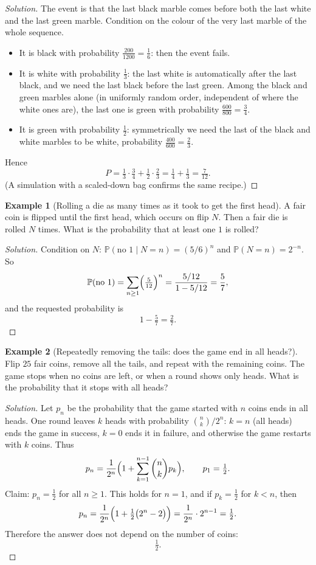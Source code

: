 \documentclass[11pt]{article}
\theoremstyle{definition}
\newtheorem{example}{Example}[section]
\begin{document}
\begin{proof}[Solution]
The event is that the last black marble comes before both the last white and the last green marble. Condition on the colour of the very last marble of the whole sequence.
\begin{itemize}
    \item It is black with probability $\tfrac{200}{1200}=\tfrac16$: then the event fails.
    \item It is white with probability $\tfrac13$: the last white is automatically after the last black, and we need the last black before the last green. Among the black and green marbles alone (in uniformly random order, independent of where the white ones are), the last one is green with probability $\tfrac{600}{800}=\tfrac34$.
    \item It is green with probability $\tfrac12$: symmetrically we need the last of the black and white marbles to be white, probability $\tfrac{400}{600}=\tfrac23$.
\end{itemize}
Hence
\[
P=\tfrac13\cdot\tfrac34+\tfrac12\cdot\tfrac23=\tfrac14+\tfrac13=\boxed{\tfrac7{12}}.
\]
(A simulation with a scaled-down bag confirms the same recipe.)
\end{proof}

\begin{example}[Rolling a die as many times as it took to get the first head]
A fair coin is flipped until the first head, which occurs on flip $N$. Then a fair die is rolled $N$ times. What is the probability that at least one $1$ is rolled?
\end{example}

\begin{proof}[Solution]
Condition on $N$: $\mathbb P(\text{no }1\mid N=n)=(5/6)^n$ and $\mathbb P(N=n)=2^{-n}$. So
\[
\mathbb P(\text{no }1)=\sum_{n\ge1}\Bigl(\tfrac{5}{12}\Bigr)^n=\frac{5/12}{1-5/12}=\frac57,
\]
and the requested probability is
\[
\boxed{1-\tfrac57=\tfrac27}.
\]
\end{proof}

\begin{example}[Repeatedly removing the tails: does the game end in all heads?]
Flip $25$ fair coins, remove all the tails, and repeat with the remaining coins. The game stops when no coins are left, or when a round shows only heads. What is the probability that it stops with all heads?
\end{example}

\begin{proof}[Solution]
Let $p_n$ be the probability that the game started with $n$ coins ends in all heads. One round leaves $k$ heads with probability $\binom nk/2^n$: $k=n$ (all heads) ends the game in success, $k=0$ ends it in failure, and otherwise the game restarts with $k$ coins. Thus
\[
p_n=\frac1{2^n}\Bigl(1+\sum_{k=1}^{n-1}\binom nkp_k\Bigr),\qquad p_1=\tfrac12 .
\]
Claim: $p_n=\tfrac12$ for all $n\ge1$. This holds for $n=1$, and if $p_k=\tfrac12$ for $k<n$, then
\[
p_n=\frac1{2^n}\Bigl(1+\tfrac12\bigl(2^n-2\bigr)\Bigr)=\frac1{2^n}\cdot2^{n-1}=\tfrac12 .
\]
Therefore the answer does not depend on the number of coins:
\[
\boxed{\tfrac12}.
\]
\end{proof}
\end{document}
